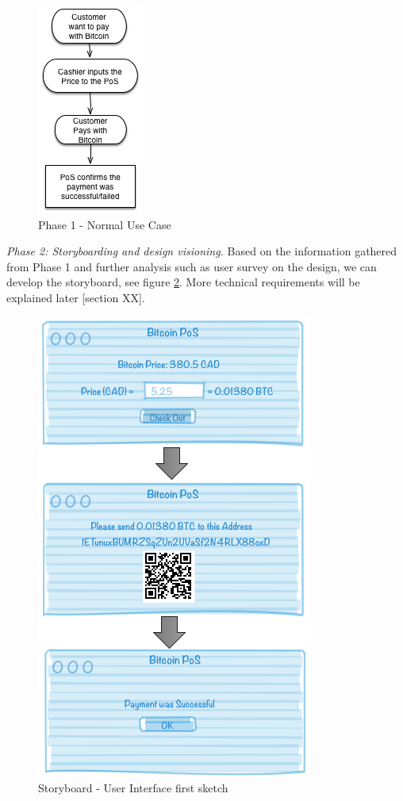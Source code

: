 \begin{figure}[htb!p]
\centering
\includegraphics[scale=0.7]{fig/RE_Scenario_Phase1.png}
  \caption{Phase 1 - Normal Use Case}
\label{fig:phase1}
\end{figure}


\textit{Phase 2: Storyboarding and design visioning.}
Based on the information gathered from Phase 1 and further analysis such as user survey on the design, we can develop the storyboard, see figure \ref{fig:storyboard}. More technical requirements will be explained later [section XX].

\begin{figure}[htb!p]
\centering
\includegraphics[scale=0.5]{fig/RE_Scenario_Interface.png}
  \caption{Storyboard - User Interface first sketch}
\label{fig:storyboard}
\end{figure}


